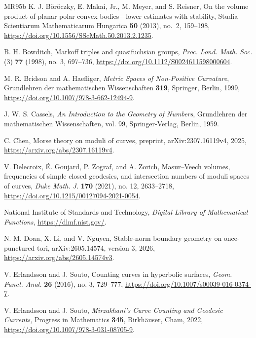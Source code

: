 \documentclass[10pt,twoside]{article}
\theoremstyle{plain}
\theoremstyle{definition}
\theoremstyle{remark}
\begin{document}
\begin{thebibliography}{MR95b}
K. J. B\"or\"oczky, E. Makai, Jr., M. Meyer, and S. Reisner,
On the volume product of planar polar convex bodies---lower
estimates with stability,
Studia Scientiarum Mathematicarum Hungarica
\textbf{50} (2013), no.~2, 159--198,
\url{https://doi.org/10.1556/SScMath.50.2013.2.1235}.

B. H. Bowditch,
Markoff triples and quasifuchsian groups,
\emph{Proc. Lond. Math. Soc.} (3) \textbf{77} (1998), no. 3, 697--736,
\url{https://doi.org/10.1112/S0024611598000604}.


M. R. Bridson and A. Haefliger,
\emph{Metric Spaces of Non-Positive Curvature},
Grundlehren der mathematischen Wissenschaften \textbf{319},
Springer, Berlin, 1999,
\url{https://doi.org/10.1007/978-3-662-12494-9}.

J. W. S. Cassels,
\emph{An Introduction to the Geometry of Numbers},
Grundlehren der mathematischen Wissenschaften, vol. 99,
Springer-Verlag, Berlin, 1959.

C. Chen,
Morse theory on moduli of curves,
preprint, arXiv:2307.16119v4, 2025,
\url{https://arxiv.org/abs/2307.16119v4}.

V. Delecroix, \'E. Goujard, P. Zograf, and A. Zorich,
Masur--Veech volumes, frequencies of simple closed geodesics, and
intersection numbers of moduli spaces of curves,
\emph{Duke Math. J.} \textbf{170} (2021), no. 12, 2633--2718,
\url{https://doi.org/10.1215/00127094-2021-0054}.

National Institute of Standards and Technology,
\emph{Digital Library of Mathematical Functions},
\url{https://dlmf.nist.gov/}.

N. M. Doan, X. Li, and V. Nguyen,
Stable-norm boundary geometry on once-punctured tori,
arXiv:2605.14574, version 3, 2026,
\url{https://arxiv.org/abs/2605.14574v3}.

V. Erlandsson and J. Souto,
Counting curves in hyperbolic surfaces,
\emph{Geom. Funct. Anal.} \textbf{26} (2016), no. 3, 729--777,
\url{https://doi.org/10.1007/s00039-016-0374-7}.

V. Erlandsson and J. Souto,
\emph{Mirzakhani's Curve Counting and Geodesic Currents},
Progress in Mathematics \textbf{345}, Birkh\"auser, Cham, 2022,
\url{https://doi.org/10.1007/978-3-031-08705-9}.


\end{thebibliography}
\end{document}
